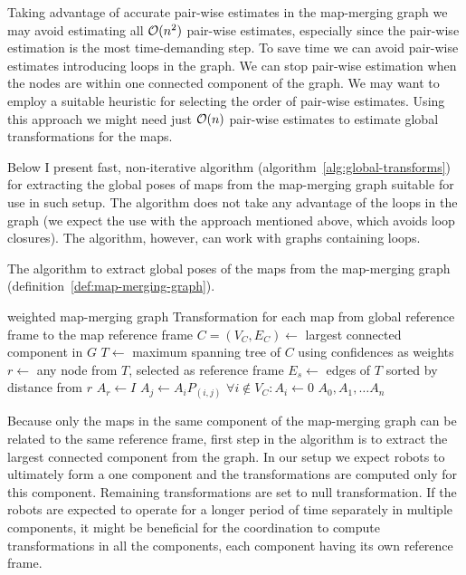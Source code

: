 Taking advantage of accurate pair-wise estimates in the map-merging graph we may avoid estimating all $\operatorname{\mathcal{O}}(n^2)$ pair-wise estimates, especially since the pair-wise estimation is the most time-demanding step. To save time we can avoid pair-wise estimates introducing loops in the graph. We can stop pair-wise estimation when the nodes are within one connected component of the graph. We may want to employ a suitable heuristic for selecting the order of pair-wise estimates. Using this approach we might need just $\operatorname{\mathcal{O}}(n)$ pair-wise estimates to estimate global transformations for the maps.

Below I present fast, non-iterative algorithm (algorithm~\ref{alg:global-transforms}) for extracting the global poses of maps from the map-merging graph suitable for use in such setup. The algorithm does not take any advantage of the loops in the graph (we expect the use with the approach mentioned above, which avoids loop closures). The algorithm, however, can work with graphs containing loops.

\begin{algorithm}
    \caption[Global poses extraction]{The algorithm to extract global poses of the maps from the map-merging graph (definition~\ref{def:map-merging-graph}).}
    \label{alg:global-transforms}
    \begin{algorithmic}[1]
        \Require weighted map-merging graph
        \Ensure Transformation for each map from global reference frame to the map reference frame
            \State $C = (V_C, E_C) \gets$ largest connected component in $G$
            \State $T \gets$ maximum spanning tree of $C$ using confidences as weights
            \State $r \gets$ any node from $T$, selected as reference frame
            \State $E_s \gets$ edges of $T$ sorted by distance from $r$
            \State $A_r \gets I$
                \State $A_j \gets A_i P_{(i,j)}$
            \EndFor
            \State $\forall i \not\in V_C: A_i \gets 0$
            \State \Return $A_0, A_1, \dots A_n$
        \EndFunction
    \end{algorithmic}
\end{algorithm}

Because only the maps in the same component of the map-merging graph can be related to the same reference frame, first step in the algorithm is to extract the largest connected component from the graph. In our setup we expect robots to ultimately form a one component and the transformations are computed only for this component. Remaining transformations are set to null transformation. If the robots are expected to operate for a longer period of time separately in multiple components, it might be beneficial for the coordination to compute transformations in all the components, each component having its own reference frame.

